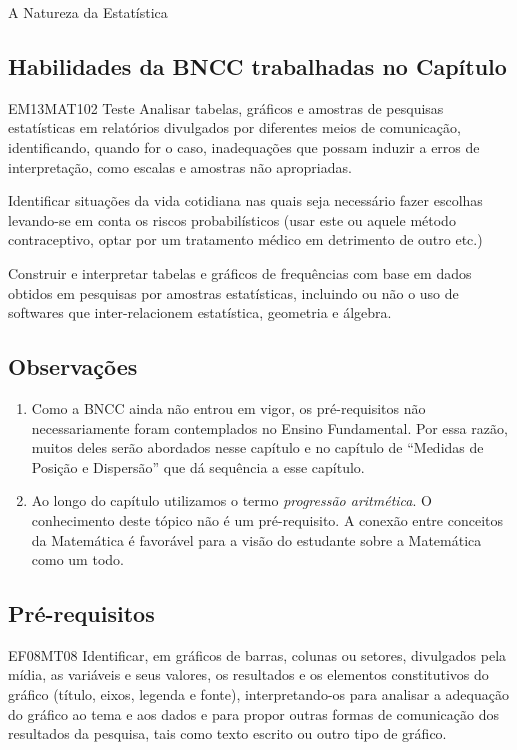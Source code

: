 \begin{apresentacao}{A Natureza da Estatística}

\subsection{Habilidades da BNCC trabalhadas no Capítulo}
\begin{habilities}{EM13MAT102}
Teste Analisar tabelas, gráficos e amostras de pesquisas estatísticas em relatórios divulgados por diferentes meios de comunicação, identificando, quando for o caso, inadequações que possam induzir a erros de interpretação, como escalas e amostras não apropriadas.

 Identificar situações da vida cotidiana nas quais seja necessário fazer escolhas levando-se em conta os riscos probabilísticos (usar este ou aquele método contraceptivo, optar por um tratamento médico em detrimento de outro etc.)

 Construir e interpretar tabelas e gráficos de frequências com base em dados obtidos em pesquisas por amostras estatísticas, incluindo ou não o uso de softwares que inter-relacionem estatística, geometria e álgebra.

\end{habilities}

\subsection{Observações}
\begin{enumerate}
\item {} 
Como a BNCC ainda não entrou em vigor, os pré-requisitos não necessariamente foram contemplados no Ensino Fundamental. Por essa razão, muitos deles serão abordados nesse capítulo e no capítulo de “Medidas de Posição e Dispersão” que dá sequência a esse capítulo.

\item {} 
Ao longo do capítulo utilizamos o termo \textit{progressão aritmética}. O conhecimento deste tópico não é um pré-requisito. A conexão entre conceitos da Matemática é favorável para a visão do estudante sobre a Matemática como um todo.

\end{enumerate}

\subsection{Pré-requisitos}
\begin{habilities}{EF08MT08}
Identificar, em gráficos de barras, colunas ou setores, divulgados pela mídia, as variáveis e seus valores, os resultados e os elementos constitutivos do gráfico (título, eixos, legenda e fonte), interpretando-os para analisar a adequação do gráfico ao tema e aos dados e para propor outras formas de comunicação dos resultados da pesquisa, tais como texto escrito ou outro tipo de gráfico.


\end{habilities}
\end{apresentacao}
